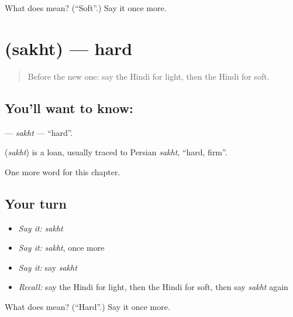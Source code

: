 \begin{tcolorbox}[breakable,colback=teal!4,colframe=teal!35!black,title={Before you move on}]
What does  mean? (\textquotedblleft{}Soft\textquotedblright{}.) Say it once more.
\end{tcolorbox}
\section[\texorpdfstring{\hi{सख़्त} (sakht)}{सख़्त (sakht)}]{ (sakht) — hard}

\label{lesson:HI-C155-sakht}



\begin{quote}
Before the new one: say the Hindi for light, then the Hindi for soft.
\end{quote}

\subsection*{You'll want to know: }
\textbf{} — \emph{sakht} — \textquotedblleft{}hard\textquotedblright{}.

\begin{cousinweb}
\textbf{} (\emph{sakht}) is a loan, usually traced to Persian \emph{sakht}, \textquotedblleft{}hard, firm\textquotedblright{}.
\end{cousinweb}

\begin{grammarlens}[title={What you've built}]
One more word for this chapter.
\end{grammarlens}

\subsection*{Your turn}
\begin{itemize}
\raggedright
  \item \emph{Say it:} \emph{sakht}
  \item \emph{Say it:} \emph{sakht}, once more
  \item \emph{Say it:} say \emph{sakht}
  \item \emph{Recall:} say the Hindi for light, then the Hindi for soft, then say \emph{sakht} again
\end{itemize}

\begin{tcolorbox}[breakable,colback=teal!4,colframe=teal!35!black,title={Before you move on}]
What does  mean? (\textquotedblleft{}Hard\textquotedblright{}.) Say it once more.
\end{tcolorbox}
